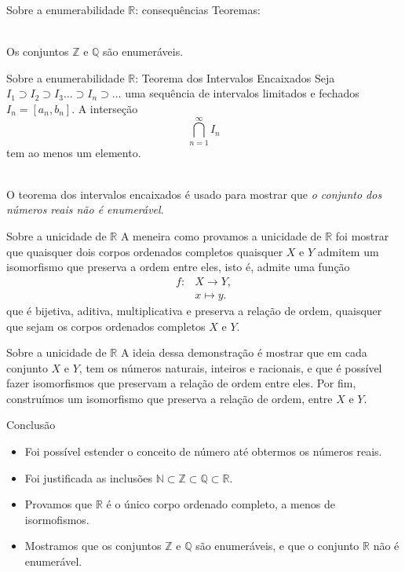 \documentclass[xcolor=dvipsnames]{beamer}
\begin{document}
\begin{frame}{Sobre a enumerabilidade $\mathbb{R}$: consequências}
    Teoremas: \\~\
    
    Os conjuntos $\mathbb{Z}$ e $\mathbb{Q}$ são enumeráveis.
\end{frame}

\begin{frame}{Sobre a enumerabilidade $\mathbb{R}$: Teorema dos Intervalos Encaixados}
    Seja $I_1 \supset I_2 \supset I_3 \dots \supset I_n \supset \dots$ uma sequência de intervalos limitados e fechados $I_n = [a_n, b_n]$.
    A interseção \[ \bigcap^\infty_{n=1} I_n \] tem ao menos um elemento.\\~\

    O teorema dos intervalos encaixados é usado para mostrar que \emph{o conjunto dos números reais não é enumerável}.
\end{frame}

\begin{frame}{Sobre a unicidade de $\mathbb{R}$}
    A meneira como provamos a unicidade de $\mathbb{R}$ foi mostrar que quaisquer dois corpos ordenados completos quaisquer $X$ e $Y$ admitem um isomorfismo que preserva a ordem entre eles, isto é, admite uma função
    \begin{align*}
        f \colon &X \to Y, \\
        &x \mapsto y.
    \end{align*}
    que é bijetiva, aditiva, multiplicativa e preserva a relação de ordem, quaisquer que sejam os corpos ordenados completos $X$ e $Y$.
\end{frame}

\begin{frame}{Sobre a unicidade de $\mathbb{R}$}
    A ideia dessa demonstração é mostrar que em cada conjunto $X$ e $Y$, tem os números naturais, inteiros e racionais, e que é possível fazer isomorfismos que preservam a relação de ordem entre eles. 
    Por fim, construímos um isomorfismo que preserva a relação de ordem, entre $X$ e $Y$.
\end{frame}

\begin{frame}{Conclusão}
    \begin{itemize}
        \item Foi possível estender o conceito de número até obtermos os números reais. 
        \item Foi justificada as inclusões 
        $\mathbb{N} \subset \mathbb{Z} \subset \mathbb{Q} \subset \mathbb{R}$.
        \item Provamos que $\mathbb{R}$ é o único corpo ordenado completo, a menos de isormofismos.
        \item Mostramos que os conjuntos $\mathbb{Z}$ e $\mathbb{Q}$ são enumeráveis, e que o conjunto $\mathbb{R}$ não é enumerável.
    \end{itemize}
    
\end{frame}
\end{document}
